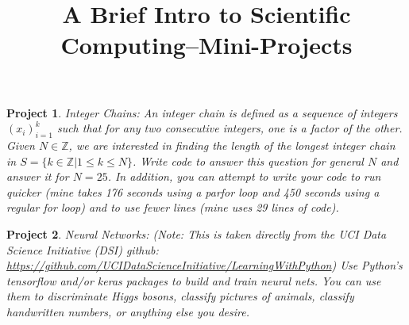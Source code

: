 \documentclass{article}
\newtheorem{project}{Project}
\begin{document}
\title{A Brief Intro to Scientific Computing--Mini-Projects}
\maketitle

\begin{project}

Integer Chains: An integer chain is defined as a sequence of integers $(x_i)_{i=1}^k$ such that for any two consecutive integers,
one is a factor of the other.
Given $N\in \mathbb{Z}$,
we are interested in finding the length of the longest integer chain in $S = \{k \in \mathbb{Z} | 1\le k \le N\}$.
Write code to answer this question for general $N$ and answer it for $N = 25$.
In addition, you can attempt to write your code to run quicker (mine takes 176 seconds using a parfor loop and 450 seconds using a regular for loop) and to use fewer lines (mine uses 29 lines of code).

\end{project}

\begin{project}

Neural Networks: (Note: This is taken directly from the UCI Data Science Initiative (DSI) github: 
\href{https://github.com/UCIDataScienceInitiative/LearningWithPython}{https://github.com/UCIDataScienceInitiative/LearningWithPython})
Use Python's tensorflow and/or keras packages to build and train neural nets.
You can use them to discriminate Higgs bosons, classify pictures of animals, classify handwritten numbers, or anything else you desire.

\end{project}
\end{document}
